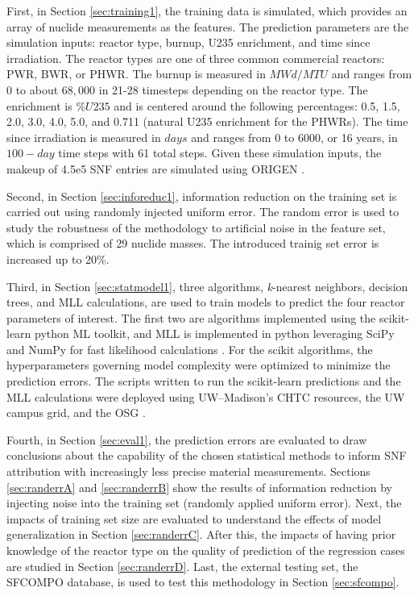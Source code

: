 First, in Section \ref{sec:training1}, the training data is simulated, which
provides an array of nuclide measurements as the features. The prediction
parameters are the simulation inputs: reactor type, burnup, \gls{U235}
enrichment, and time since irradiation.  The reactor types are one of three
common commercial reactors: \gls{PWR}, \gls{BWR}, or \gls{PHWR}.  The burnup is
measured in $MWd/MTU$ and ranges from 0 to about $68,000$ in 21-28 timesteps
depending on the reactor type.  The enrichment is $\%U235$ and is centered
around the following percentages: 0.5, 1.5, 2.0, 3.0, 4.0, 5.0, and 0.711
(natural \gls{U235} enrichment for the \gls{PHWR}s).  The time since
irradiation is measured in $days$ and ranges from 0 to 6000, or 16 years, in
$100-day$ time steps with 61 total steps. Given these simulation inputs, the
makeup of 4.5e5 \gls{SNF} entries are simulated using \gls{ORIGEN} \cite{scale,
origen, origenarp}.

Second, in Section \ref{sec:inforeduc1}, information reduction on the training
set is carried out using randomly injected uniform error. The random error is
used to study the robustness of the methodology to artificial noise in the
feature set, which is comprised of 29 nuclide masses.  The introduced trainig
set error is increased up to 20\%.

Third, in Section \ref{sec:statmodel1}, three algorithms, \textit{k}-nearest
neighbors, decision trees, and \gls{MLL} calculations, are used to train models
to predict the four reactor parameters of interest.  The first two are
algorithms implemented using the scikit-learn python \gls{ML} toolkit, and
\gls{MLL} is implemented in python leveraging SciPy and NumPy for fast
likelihood calculations \cite{scikit, scipy, numpy}.  For the scikit
algorithms, the hyperparameters governing model complexity were optimized to
minimize the prediction errors.  The scripts written to run the scikit-learn
predictions and the \gls{MLL} calculations were deployed using
\gls{UW}--Madison's \gls{CHTC} resources, the \gls{UW} campus grid, and the
\gls{OSG} \cite{osg07, osg09}.  

Fourth, in Section \ref{sec:eval1}, the prediction errors are evaluated to draw
conclusions about the capability of the chosen statistical methods to inform
\gls{SNF} attribution with increasingly less precise material measurements.
Sections \ref{sec:randerrA} and \ref{sec:randerrB} show the results of
information reduction by injecting noise into the training set (randomly
applied uniform error).  Next, the impacts of training set size are evaluated
to understand the effects of model generalization in Section
\ref{sec:randerrC}. After this, the impacts of having prior knowledge of the
reactor type on the quality of prediction of the regression cases are studied
in Section \ref{sec:randerrD}. Last, the external testing set, the
\gls{SFCOMPO} database, is used to test this methodology in Section
\ref{sec:sfcompo}. 

